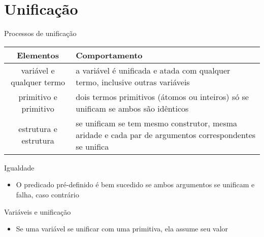 \section{Unificação}

\begin{frame}[fragile]{Processos de unificação}

    \begin{table}
        \centering

        \begin{tabularx}{0.9\textwidth}{cX}
            \toprule
            \textbf{Elementos} & \textbf{Comportamento} \\            
            \midrule

            variável e qualquer termo & a variável é unificada e atada com qualquer termo, 
                inclusive outras variáveis \\
            \midrule

            primitivo e primitivo & dois termos primitivos (átomos ou inteiros) só se unificam 
                se ambos são idênticos \\
            \midrule

            estrutura e estrutura & se unificam se tem mesmo construtor, mesma aridade e cada 
                par de argumentos correspondentes se unifica \\
            \bottomrule
        \end{tabularx}
    \end{table}

\end{frame}

\begin{frame}[fragile]{Igualdade}

    \begin{itemize}
        \item O predicado pré-definido  é bem sucedido se ambos argumentos 
            se unificam e falha, caso contrário


    \end{itemize}

\end{frame}

\begin{frame}[fragile]{Variáveis e unificação}

    \begin{itemize}
        \item Se uma variável se unificar com uma primitiva, ela assume seu valor


    \end{itemize}

\end{frame}

